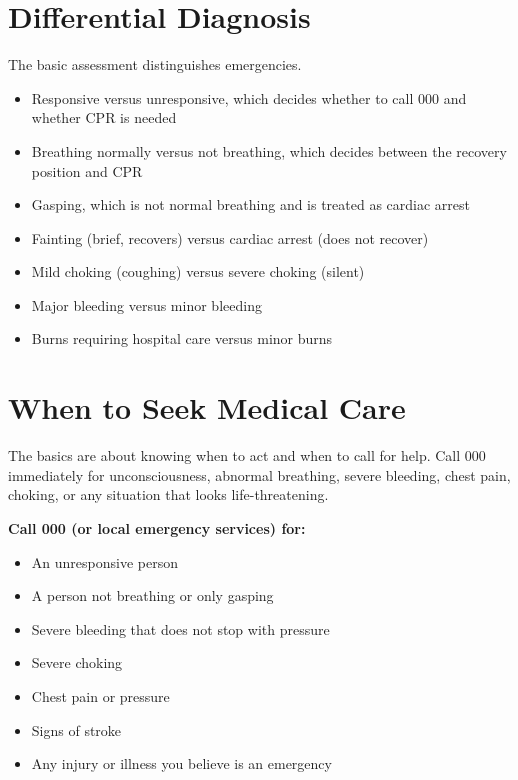 \section*{Differential Diagnosis}
The basic assessment distinguishes emergencies.
\begin{itemize}
    \item Responsive versus unresponsive, which decides whether to call 000 and whether CPR is needed
    \item Breathing normally versus not breathing, which decides between the recovery position and CPR
    \item Gasping, which is not normal breathing and is treated as cardiac arrest
    \item Fainting (brief, recovers) versus cardiac arrest (does not recover)
    \item Mild choking (coughing) versus severe choking (silent)
    \item Major bleeding versus minor bleeding
    \item Burns requiring hospital care versus minor burns
\end{itemize}

\section*{When to Seek Medical Care}
The basics are about knowing when to act and when to call for help. Call 000 immediately for unconsciousness, abnormal breathing, severe bleeding, chest pain, choking, or any situation that looks life-threatening.

\textbf{Call 000 (or local emergency services) for:}
\begin{itemize}
    \item An unresponsive person
    \item A person not breathing or only gasping
    \item Severe bleeding that does not stop with pressure
    \item Severe choking
    \item Chest pain or pressure
    \item Signs of stroke
    \item Any injury or illness you believe is an emergency
\end{itemize}

